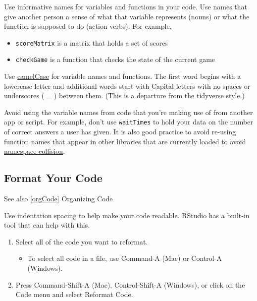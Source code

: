 \documentclass[
]{book}
\providecommand{\tightlist}{%
  \setlength{\itemsep}{0pt}\setlength{\parskip}{0pt}}
\begin{document}
Use informative names for variables and functions in your code. Use names that give another person a sense of what that variable represents (nouns) or what the function is supposed to do (action verbs). For example,

\begin{itemize}
\tightlist
\item
  \texttt{scoreMatrix} is a matrix that holds a set of scores\\
\item
  \texttt{checkGame} is a function that checks the state of the current game
\end{itemize}

Use \href{https://en.wikipedia.org/wiki/Camel_case}{camelCase} for variable names and functions. The first word begins with a lowercase letter and additional words start with Capital letters with no spaces or underscores ( \_ ) between them. (This is a departure from the tidyverse style.)

Avoid using the variable names from code that you're making use of from another app or script. For example, don't use \texttt{waitTimes} to hold your data on the number of correct answers a user has given. It is also good practice to avoid re-using function names that appear in other libraries that are currently loaded to avoid \href{https://en.wikipedia.org/wiki/Naming_collision}{namespace collision}.

\hypertarget{formatCode}{%
\subsection{Format Your Code}\label{formatCode}}

See also \ref{orgCode} Organizing Code

Use indentation spacing to help make your code readable. RStudio has a built-in tool that can help with this.

\begin{enumerate}
\def\labelenumi{\arabic{enumi}.}
\tightlist
\item
  Select all of the code you want to reformat.

  \begin{itemize}
  \tightlist
  \item
    To select all code in a file, use Command-A (Mac) or Control-A (Windows).
  \end{itemize}
\item
  Press Command-Shift-A (Mac), Control-Shift-A (Windows), or click on the Code menu and select Reformat Code.
\end{enumerate}
\end{document}

